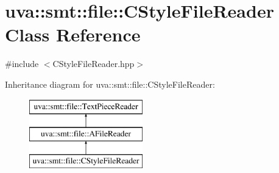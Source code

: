 \hypertarget{classuva_1_1smt_1_1file_1_1_c_style_file_reader}{}\section{uva\+:\+:smt\+:\+:file\+:\+:C\+Style\+File\+Reader Class Reference}
\label{classuva_1_1smt_1_1file_1_1_c_style_file_reader}


{\ttfamily \#include $<$C\+Style\+File\+Reader.\+hpp$>$}

Inheritance diagram for uva\+:\+:smt\+:\+:file\+:\+:C\+Style\+File\+Reader\+:\begin{figure}[H]
\begin{center}
\leavevmode
\includegraphics[height=3.000000cm]{classuva_1_1smt_1_1file_1_1_c_style_file_reader}
\end{center}
\end{figure}
